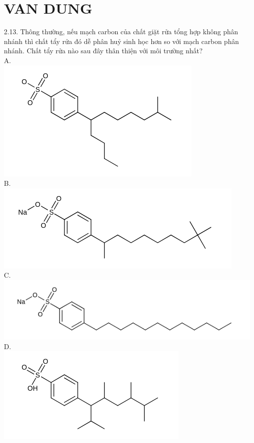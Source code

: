 \documentclass[10pt]{article}
\begin{document}
\section*{VAN DUNG}
2.13. Thông thường, nếu mạch carbon của chất giặt rửa tổng hợp không phân nhánh thì chất tẩy rửa đó dễ phân huỷ sinh học hơn so với mạch carbon phân nhánh. Chất tẩy rửa nào sau đây thân thiện với môi trường nhất?\\
A.\\
\includegraphics{smile-2e5e834685bbef91efaf354f3233b12c3a1ab74d}\\
B.\\
\includegraphics{smile-ecacd046a34735305dab26b5868c3eb593ab2f2f}\\
C.\\
\includegraphics{smile-2b6ebd6daa642cf6773f02712e7f59cbacbf6870}\\
D.\\
\includegraphics{smile-c64e3fcf51cc461cf6f35353faa7c225cdbebf3a}
\end{document}

